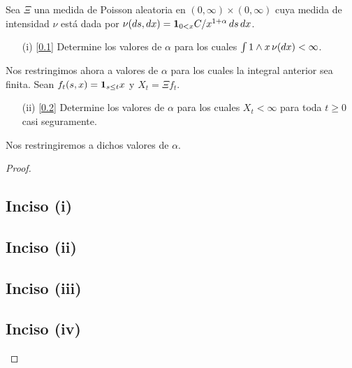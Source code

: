 \begin{problema}
    Sea $\Xi$ una medida de Poisson aleatoria en $(0,\infty)\times (0,\infty)$ cuya 
    medida de intensidad $\nu$ est\'a dada por $\nu\!\left( ds,dx\right) ={\bf{1}}_{0<x} C/x^{1+\alpha}\, ds\,dx$. 
    
    \begin{enumerate}
        \item[(i)]		[\ref{problema5_2:inciso1}] 
			Determine los valores de $\alpha$ para los cuales $\int 1 \wedge x\,\nu\!\left( dx\right) <\infty$.\pn 
    \end{enumerate}
    
    Nos restringimos ahora a valores de $\alpha$ para los cuales la integral anterior sea finita. 
	Sean $f_t\!\left( s,x\right) ={\bf{1}}_{s\leq t}x$ y $X_t=\Xi f_t$. 
    
    \begin{enumerate}[resume]
        \item[(ii)]		[\ref{problema5_2:inciso2}] 
			Determine los valores  de $\alpha$ para los cuales $X_t < \infty$ para toda $t \geq 0$ casi seguramente.\pn
    \end{enumerate}

    Nos restringiremos a dichos valores de $\alpha$. 
    
\end{problema}

\begin{proof}
	\subsection{Inciso (i)}	\label{problema5_2:inciso1}
	
	\newpage
	
	\subsection{Inciso (ii)}	\label{problema5_2:inciso2}
	
	\newpage
	
	\subsection{Inciso (iii)}	\label{problema5_2:inciso3}
	
	\newpage
	
	\subsection{Inciso (iv)}	\label{problema5_2:inciso4}
	
\end{proof}